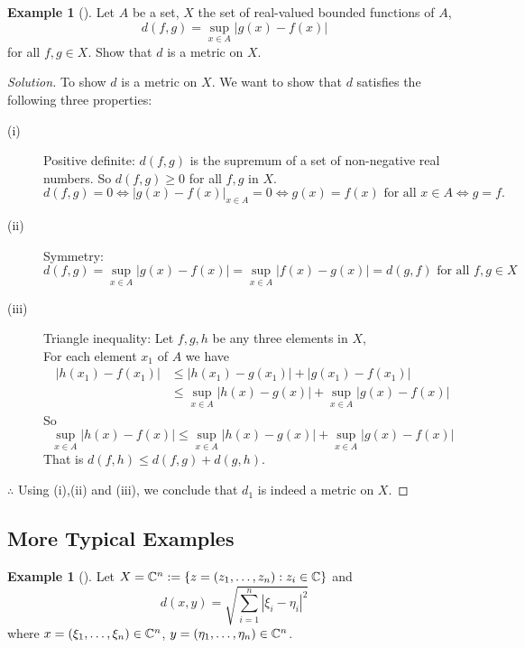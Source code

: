 \documentclass[	DIV=calc,paper=a4,fontsize=11pt]{scrartcl}	 	%
\theoremstyle{definition}
\newtheorem{exmp}[thm]{Example}
\theoremstyle{plain}
\theoremstyle{remark}
\begin{document}
\begin{exmp}[]
Let $A$ be a set, $X$ the set of real-valued bounded functions of $A$,
\[d(f,g)=\sup_{x\in A}|g(x)-f(x)|\]
for all $f,g\in X$. Show that $d$ is a metric on $X$.
\end{exmp}
\begin{proof}[Solution]
To show $d$ is a metric on $X$. We want to show that $d$ satisfies the following three properties:
\begin{description}
  \item[(i)] Positive definite:
$d(f,g)$ is the supremum of a set of non-negative real numbers. So $d(f, g)\ge0$ for all $f,g$ in $X$.
\[d(f,g) = 0 \Leftrightarrow {|g(x)-f(x)|}_{x\in A}={0}\Leftrightarrow g(x) = f(x) \text{ for all }x\in A\Leftrightarrow g=f.\]
  \item[(ii)] Symmetry:
\[d(f,g)=\sup_{x\in A}|g(x)-f(x)|=\sup_{x\in A}|f(x)-g(x)|=d(g,f) \text{ for all } f,g\in X\]
  \item[(iii)] Triangle inequality: Let $f,g,h$ be any three elements in $X$,\\
  For each element $x_1$ of $A$ we have
\begin{align*}
|h(x_1)-f(x_1)|&\le |h(x_1)-g(x_1)| + |g(x_1)-f(x_1)|\\
                            &\le \sup_{x\in A}|h(x)-g(x)|+\sup_{x\in A}|g(x)-f(x)|
\end{align*}
So
\[\sup_{x\in A}|h(x)-f(x)|\le \sup_{x\in A}|h(x)-g(x)|+\sup_{x\in A}|g(x)-f(x)|\]
That is $d(f,h)\le d(f,g)+d(g,h)$.
\end{description}
$\therefore$ Using (i),(ii) and (iii), we conclude that $d_1$ is indeed a metric on $X$.
\end{proof}
\subsection{More Typical Examples}
\begin{exmp}[]
Let $X=\Bbb C^n:=\{z=(z_1,\ldots,z_n):z_i\in \Bbb C\}$ and
\[d(x,y)=\sqrt{\sum_{i=1}^{n}|\xi_i-\eta_i|^2}\]
where $x=(\xi_1,\ldots,\xi_n)\in \Bbb C^n$, $y=(\eta_1,\ldots, \eta_n)\in \Bbb C^n$.
\end{exmp}
\end{document}
